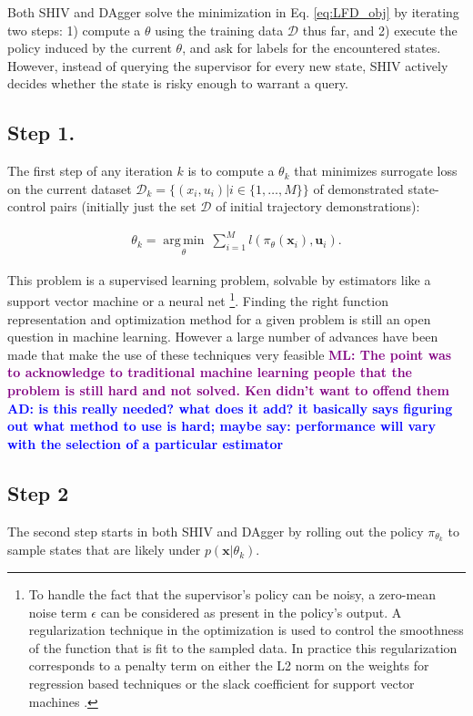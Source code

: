 \documentclass[10pt, conference]{ieeeconf}      %
\DeclareMathOperator*{\argmin}{arg\,min}
\newcommand{\bu}{\mathbf{u}}
\newcommand{\bx}{\mathbf{x}}
\newcommand{\adnote}[1]{\ifthenelse{ \boolean{include-notes}}%
 {\textcolor{blue}{\textbf{AD: #1}}}{}}
\newcommand{\mlnote}[1]{\ifthenelse{ \boolean{include-notes}}%
 {\textcolor{purple}{\textbf{ML: #1}}}{}}
\begin{document}
Both SHIV and DAgger \cite{ross2010reduction} solve the minimization in Eq. \ref{eq:LFD_obj} by iterating two steps: 1) compute a $\theta$ using the training data $\mathcal{D}$ thus far, and 2) execute the policy induced by the current $\theta$, and ask for labels for the encountered states. However, instead of querying the supervisor for every new state, SHIV actively decides whether the state is risky enough to warrant a query. 


\subsection{Step 1.}
The first step of any iteration $k$ is to compute a $\theta_k$ that minimizes surrogate loss on the current dataset $\mathcal{D}_k=\{(x_i,u_i)|i\in\{1,\ldots,M\}\}$ of demonstrated state-control pairs (initially just the set $\mathcal{D}$ of initial trajectory demonstrations):


 \vspace{-2ex}
\begin{align}\label{eq:super_objj}
\theta_{k} = \underset{\theta}{\argmin} \: \sum_{i=1}^{M} l(\pi_{\theta}(\bx_i),\bu_i).
\end{align}


This problem is a supervised learning problem, solvable by estimators like a support vector machine or a neural net \footnote{To handle the fact that the supervisor's policy can be noisy, a zero-mean noise term $\epsilon$ 
can be considered as present in the policy's output.  A regularization technique in the optimization is
used to control the smoothness of the function that is fit to the sampled data. In practice this regularization corresponds to a penalty term on either the L2 norm on the weights for regression based techniques or the slack coefficient for support vector machines \cite{scholkopf2002learning}.}.  Finding the right function representation and optimization method for a given problem is still an open question in machine learning. However a large number of advances have been made that make the use of these techniques very feasible \cite{scholkopf2002learning} \mlnote{The point was to acknowledge to traditional machine learning people that the problem is still hard and not solved. Ken didn't want to offend them}\adnote{is this really needed? what does it add? it basically says figuring out what method to use is hard; maybe say: performance will vary with the selection of a particular estimator \cite{}}
 

 \subsection{Step 2}
The second step starts in both SHIV and DAgger by rolling out the policy $\pi_{\theta_{k}}$ to sample states that are likely under $p(\bx|\theta_{k})$. 
\end{document}
